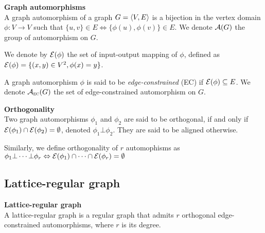 
\begin{definition}\textbf{Graph automorphisms}\\
A graph automorphism of a graph $G = \langle V, E \rangle$ is a bijection in the vertex domain $\phi: V \rightarrow V$ such that $\{u,v\} \in E \Leftrightarrow \{\phi(u), \phi(v)\} \in E$. We denote $\mathcal{A}(G)$ the group of automorphism on $G$.

We denote by $\mathcal{E}(\phi)$ the set of input-output mapping of $\phi$, defined as $\mathcal{E}(\phi) = \{ (x,y) \in V^2, \phi(x) = y \}$.

A graph automorphism $\phi$ is said to be \emph{edge-constrained} (EC) if $\mathcal{E}(\phi) \subseteq E$. We denote $\mathcal{A}_{\operatorname{\textsc{ec}}}(G)$ the set of edge-constrained automorphism on $G$.
\end{definition}

\begin{definition}\textbf{Orthogonality}\\
Two graph automorphisms $\phi_1$ and $\phi_2$ are said to be orthogonal, if and only if $\mathcal{E}(\phi_1) \cap \mathcal{E}(\phi_2) = \emptyset$, denoted $\phi_1 \bot \phi_2$. They are said to be aligned otherwise.

Similarly, we define orthogonality of $r$ automophisms as $\phi_1 \bot \cdots \bot \phi_r \Leftrightarrow \mathcal{E}(\phi_1) \cap \cdots \cap \mathcal{E}(\phi_r) = \emptyset$
\end{definition}


\subsection{Lattice-regular graph}


\begin{definition}\textbf{Lattice-regular graph}\\
A lattice-regular graph is a regular graph that admits $r$ orthogonal edge-constrained automorphisms, where $r$ is its degree.
\end{definition}





